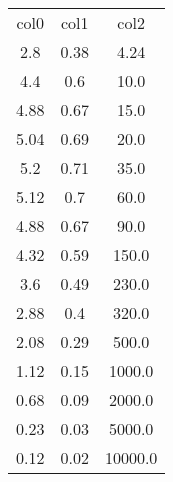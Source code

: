 \begin{table}
\begin{tabular}{ccc}
col0 & col1 & col2 \\
2.8 & 0.38 & 4.24 \\
4.4 & 0.6 & 10.0 \\
4.88 & 0.67 & 15.0 \\
5.04 & 0.69 & 20.0 \\
5.2 & 0.71 & 35.0 \\
5.12 & 0.7 & 60.0 \\
4.88 & 0.67 & 90.0 \\
4.32 & 0.59 & 150.0 \\
3.6 & 0.49 & 230.0 \\
2.88 & 0.4 & 320.0 \\
2.08 & 0.29 & 500.0 \\
1.12 & 0.15 & 1000.0 \\
0.68 & 0.09 & 2000.0 \\
0.23 & 0.03 & 5000.0 \\
0.12 & 0.02 & 10000.0 \\
\end{tabular}
\end{table}
